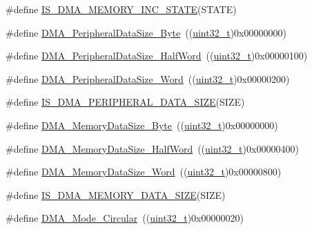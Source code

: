 \begin{DoxyCompactItemize}
\#define \hyperlink{group___d_m_a__memory__incremented__mode_gaa880f39d499d1e80449cf80381e4eb67}{I\+S\+\_\+\+D\+M\+A\+\_\+\+M\+E\+M\+O\+R\+Y\+\_\+\+I\+N\+C\+\_\+\+S\+T\+A\+TE}(S\+T\+A\+TE)
\item 
\#define \hyperlink{group___d_m_a__peripheral__data__size_ga7577035ae4ff413164000227a8cea346}{D\+M\+A\+\_\+\+Peripheral\+Data\+Size\+\_\+\+Byte}~((\hyperlink{_p_e___types_8h_a33594304e786b158f3fb30289278f5af}{uint32\+\_\+t})0x00000000)
\item 
\#define \hyperlink{group___d_m_a__peripheral__data__size_gab1988e5005ee65c261018f62866e4585}{D\+M\+A\+\_\+\+Peripheral\+Data\+Size\+\_\+\+Half\+Word}~((\hyperlink{_p_e___types_8h_a33594304e786b158f3fb30289278f5af}{uint32\+\_\+t})0x00000100)
\item 
\#define \hyperlink{group___d_m_a__peripheral__data__size_ga516ea7a40945d8325fe73e079b245ea1}{D\+M\+A\+\_\+\+Peripheral\+Data\+Size\+\_\+\+Word}~((\hyperlink{_p_e___types_8h_a33594304e786b158f3fb30289278f5af}{uint32\+\_\+t})0x00000200)
\item 
\#define \hyperlink{group___d_m_a__peripheral__data__size_gad7916e0ae55cdf5efdfa68a09a028037}{I\+S\+\_\+\+D\+M\+A\+\_\+\+P\+E\+R\+I\+P\+H\+E\+R\+A\+L\+\_\+\+D\+A\+T\+A\+\_\+\+S\+I\+ZE}(S\+I\+ZE)
\item 
\#define \hyperlink{group___d_m_a__memory__data__size_gad6093bccb60ff9adf81e21c73c58ba17}{D\+M\+A\+\_\+\+Memory\+Data\+Size\+\_\+\+Byte}~((\hyperlink{_p_e___types_8h_a33594304e786b158f3fb30289278f5af}{uint32\+\_\+t})0x00000000)
\item 
\#define \hyperlink{group___d_m_a__memory__data__size_ga74c9b4e547f5eaaf35d4fd3d01ed5741}{D\+M\+A\+\_\+\+Memory\+Data\+Size\+\_\+\+Half\+Word}~((\hyperlink{_p_e___types_8h_a33594304e786b158f3fb30289278f5af}{uint32\+\_\+t})0x00000400)
\item 
\#define \hyperlink{group___d_m_a__memory__data__size_gaff403722a6f82d4b34c9ef306507bb98}{D\+M\+A\+\_\+\+Memory\+Data\+Size\+\_\+\+Word}~((\hyperlink{_p_e___types_8h_a33594304e786b158f3fb30289278f5af}{uint32\+\_\+t})0x00000800)
\item 
\#define \hyperlink{group___d_m_a__memory__data__size_gac9e3748cebcb16d4ae4206d562bc804c}{I\+S\+\_\+\+D\+M\+A\+\_\+\+M\+E\+M\+O\+R\+Y\+\_\+\+D\+A\+T\+A\+\_\+\+S\+I\+ZE}(S\+I\+ZE)
\item 
\#define \hyperlink{group___d_m_a__circular__normal__mode_ga36327b14c302098fbc5823ac3f1ae020}{D\+M\+A\+\_\+\+Mode\+\_\+\+Circular}~((\hyperlink{_p_e___types_8h_a33594304e786b158f3fb30289278f5af}{uint32\+\_\+t})0x00000020)

\end{DoxyCompactItemize}
